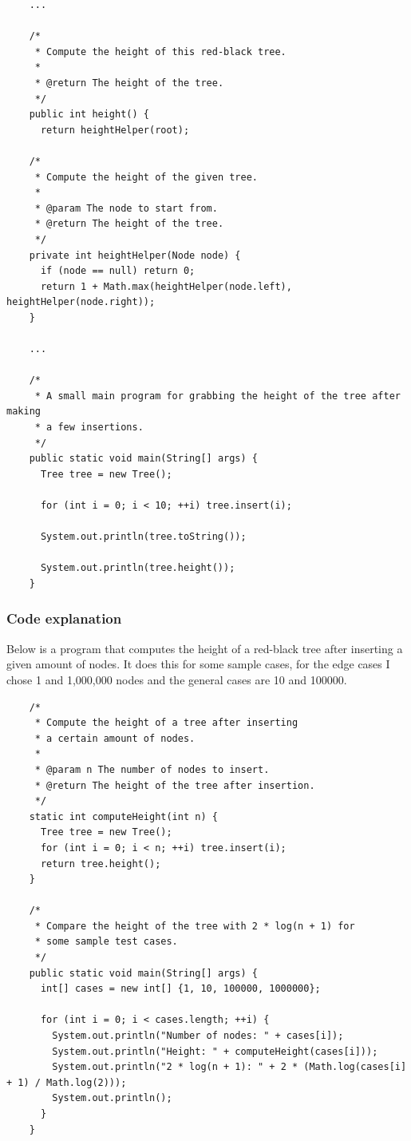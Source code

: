\documentclass[10pt]{article}
\begin{document}
  \begin{verbatim}
    ...

    /*
     * Compute the height of this red-black tree.
     *
     * @return The height of the tree.
     */
    public int height() {
      return heightHelper(root);

    /*
     * Compute the height of the given tree.
     *
     * @param The node to start from.
     * @return The height of the tree.
     */
    private int heightHelper(Node node) {
      if (node == null) return 0;
      return 1 + Math.max(heightHelper(node.left), heightHelper(node.right));
    }

    ...

    /*
     * A small main program for grabbing the height of the tree after making
     * a few insertions.
     */
    public static void main(String[] args) {
      Tree tree = new Tree();

      for (int i = 0; i < 10; ++i) tree.insert(i);

      System.out.println(tree.toString());

      System.out.println(tree.height());
    }
  \end{verbatim}

  \subsubsection*{Code explanation}


  Below is a program that computes the height of a red-black tree after inserting
  a given amount of nodes. It does this for some sample cases, for the edge cases
  I chose 1 and 1,000,000 nodes and the general cases are 10 and 100000.

  \begin{verbatim}
    /*
     * Compute the height of a tree after inserting
     * a certain amount of nodes.
     *
     * @param n The number of nodes to insert.
     * @return The height of the tree after insertion.
     */
    static int computeHeight(int n) {
      Tree tree = new Tree();
      for (int i = 0; i < n; ++i) tree.insert(i);
      return tree.height();
    }

    /*
     * Compare the height of the tree with 2 * log(n + 1) for
     * some sample test cases.
     */
    public static void main(String[] args) {
      int[] cases = new int[] {1, 10, 100000, 1000000};

      for (int i = 0; i < cases.length; ++i) {
        System.out.println("Number of nodes: " + cases[i]);
        System.out.println("Height: " + computeHeight(cases[i]));
        System.out.println("2 * log(n + 1): " + 2 * (Math.log(cases[i] + 1) / Math.log(2)));
        System.out.println();
      }
    }
  \end{verbatim}
\end{document}
